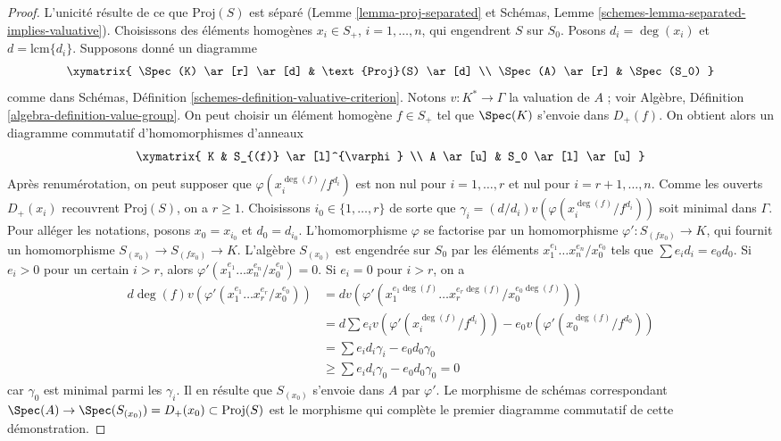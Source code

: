 \begin{proof}
L'unicité résulte de ce que $\text{Proj}(S)$ est séparé
(Lemme \ref{lemma-proj-separated} et Schémas,
Lemme \ref{schemes-lemma-separated-implies-valuative}).
Choisissons des éléments homogènes $x_i \in S_{+}$, $i = 1, \ldots, n$,
qui engendrent $S$ sur $S_0$. Posons $d_i = \deg(x_i)$ et
$d = \text{lcm}\{d_i\}$. Supposons donné un diagramme
$$
\xymatrix{
\Spec(K) \ar[r] \ar[d] & \text{Proj}(S) \ar[d] \\
\Spec(A) \ar[r] & \Spec(S_0)
}
$$
comme dans Schémas, Définition \ref{schemes-definition-valuative-criterion}.
Notons $v : K^* \to \Gamma$ la valuation de $A$ ; voir Algèbre,
Définition \ref{algebra-definition-value-group}. On peut choisir un élément
homogène $f \in S_{+}$ tel que $\Spec(K)$ s'envoie dans $D_{+}(f)$. On obtient
alors un diagramme commutatif d'homomorphismes d'anneaux
$$
\xymatrix{
K & S_{(f)} \ar[l]^{\varphi} \\
A \ar[u] & S_0 \ar[l] \ar[u]
}
$$
Après renumérotation, on peut supposer que
$\varphi(x_i^{\deg(f)}/f^{d_i})$ est non nul pour $i = 1, \ldots, r$ et nul
pour $i = r + 1, \ldots, n$. Comme les ouverts $D_{+}(x_i)$ recouvrent
$\text{Proj}(S)$, on a $r \geq 1$. Choisissons
$i_0 \in \{1, \ldots, r\}$ de sorte que
$\gamma_i = (d/d_i)v(\varphi(x_i^{\deg(f)}/f^{d_i}))$ soit minimal dans
$\Gamma$. Pour alléger les notations, posons $x_0 = x_{i_0}$ et
$d_0 = d_{i_0}$. L'homomorphisme $\varphi$ se factorise par un homomorphisme
$\varphi' : S_{(fx_0)} \to K$, qui fournit un homomorphisme
$S_{(x_0)} \to S_{(fx_0)} \to K$.
L'algèbre $S_{(x_0)}$ est engendrée sur $S_0$ par les éléments
$x_1^{e_1} \ldots x_n^{e_n}/x_0^{e_0}$ tels que
$\sum e_i d_i = e_0 d_0$. Si $e_i > 0$ pour un certain $i > r$, alors
$\varphi'(x_1^{e_1} \ldots x_n^{e_n}/x_0^{e_0}) = 0$.
Si $e_i = 0$ pour $i > r$, on a
\begin{align*}
d \deg(f) v(\varphi'(x_1^{e_1} \ldots x_r^{e_r}/x_0^{e_0}))
& =
d v(\varphi'(x_1^{e_1 \deg(f)} \ldots x_r^{e_r \deg(f)}/x_0^{e_0 \deg(f)})) \\
& =
d \sum e_i v(\varphi'(x_i^{\deg(f)}/f^{d_i}))
- e_0 v(\varphi'(x_0^{\deg(f)}/f^{d_0})) \\
& =
\sum e_i d_i \gamma_i - e_0 d_0 \gamma_0 \\
& \geq
\sum e_i d_i \gamma_0 - e_0 d_0 \gamma_0 = 0
\end{align*}
car $\gamma_0$ est minimal parmi les $\gamma_i$. Il en résulte que
$S_{(x_0)}$ s'envoie dans $A$ par $\varphi'$. Le morphisme de schémas correspondant
$\Spec(A) \to \Spec(S_{(x_0)}) = D_{+}(x_0)
\subset \text{Proj}(S)$ est le morphisme qui complète le premier diagramme
commutatif de cette démonstration.
\end{proof}

